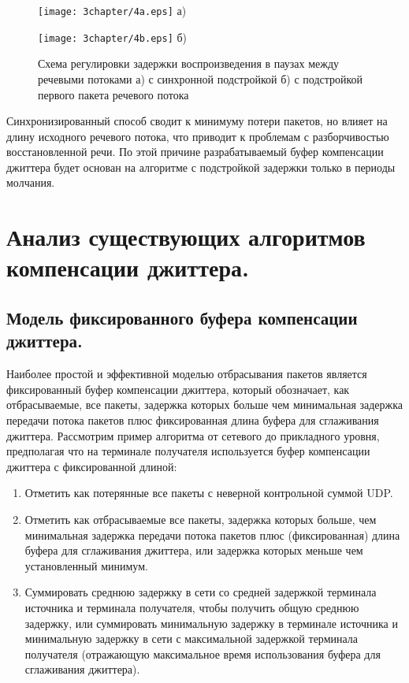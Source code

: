 \begin{figure} [!h]
\begin{minipage}[h]{0.85\linewidth}
\center
\texttt{[image: 3chapter/4a.eps]} а) \\
\end{minipage}
\vfill
\begin{minipage}[h]{0.95\linewidth}
\center
\texttt{[image: 3chapter/4b.eps]} б) \\
\end{minipage}
\caption{Схема регулировки задержки воспроизведения в паузах между речевыми потоками а) с синхронной подстройкой б) с подстройкой первого пакета речевого потока }
\label{img3:manageDelay}
\end{figure}


Синхронизированный способ сводит к минимуму потери пакетов, но влияет на длину исходного речевого потока, что приводит к проблемам с разборчивостью восстановленной речи. По этой причине разрабатываемый буфер компенсации джиттера будет основан на алгоритме с подстройкой задержки только в периоды молчания.


\section{Анализ существующих алгоритмов компенсации джиттера.} \label{sect3_4}
\subsection{Модель фиксированного буфера компенсации джиттера.} \label{sect3_4_1}

Наиболее простой и эффективной моделью отбрасывания пакетов является фиксированный буфер компенсации джиттера, который обозначает, как отбрасываемые, все пакеты, задержка которых больше чем минимальная задержка передачи потока пакетов плюс фиксированная длина буфера для сглаживания джиттера.
Рассмотрим пример алгоритма от сетевого до прикладного уровня, предполагая что на терминале получателя используется буфер компенсации джиттера с фиксированной длиной:
\begin{enumerate}
\item Отметить как потерянные все пакеты с неверной контрольной суммой UDP.
\item Отметить как отбрасываемые все пакеты, задержка которых больше, чем минимальная задержка передачи потока пакетов плюс (фиксированная) длина буфера для сглаживания джиттера, или задержка которых меньше чем установленный минимум. 
\item Суммировать среднюю задержку в сети со средней задержкой терминала источника и терминала получателя, чтобы получить общую среднюю задержку, или суммировать минимальную задержку в терминале источника и минимальную задержку в сети с максимальной задержкой терминала получателя (отражающую максимальное время использования буфера для сглаживания джиттера).
\end{enumerate}

